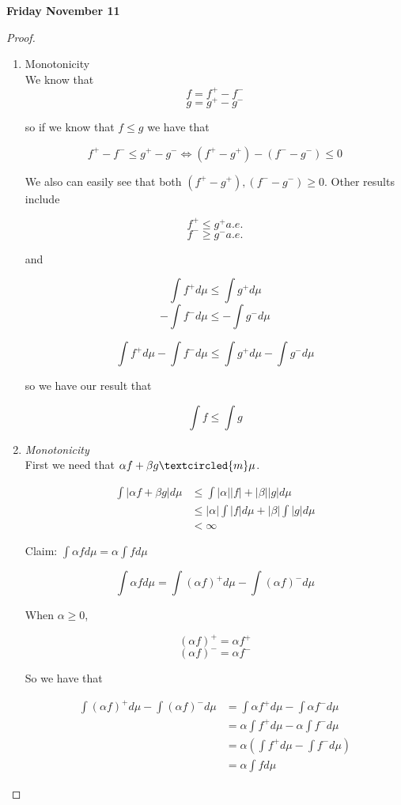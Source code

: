 \documentclass[11pt,fleqn]{book} %
\begin{document}
\textbf{Friday November 11}\\

\begin{proof}
	\begin{enumerate}
		\item Monotonicity\\
			We know that
				$$f = f^+ - f^- $$
				$$g = g^+ - g^- $$

			so if we know that $f \leq g$ we have that

					$$f^+  - f^- \leq g^+ - g^- \Leftrightarrow (f^+ - g^+ ) - (f^- - g^-) \leq 0$$

			We also can easily see that both $(f^+ - g^+ ), (f^- - g^-) \geq 0$. Other results include

					$$f^+ \leq g^+ a.e.$$
					$$f^- \geq g^- a.e.$$

			and

					$$\int f^+ d\mu \leq \int g^+ d\mu$$
					$$-\int f^- d\mu \leq -\int g^- d\mu$$

					$$\int f^+ d\mu  -\int f^- d\mu \leq \int g^+ d\mu -\int g^- d\mu$$

			so we have our result that

					$$\int f \leq \int g$$

		\item  \textit{Monotonicity}\\

		First we need that $\alpha f + \beta g \textcircled{m} \mu$. 

		\begin{align*}
			\int | \alpha f + \beta g| d\mu &\leq \int |\alpha| |f| + |\beta||g| d\mu\\
					&\leq |\alpha| \int |f| d\mu + |\beta| \int |g| d\mu\\
					&< \infty
		\end{align*}

		Claim: $\int \alpha f d\mu = \alpha \int f d\mu$

			
					$$\int \alpha f d\mu = \int (\alpha f)^+ d\mu - \int (\alpha f)^- d\mu$$
				

			When $\alpha \geq 0$, 

					$$(\alpha f)^+ = \alpha f^+ $$
					$$(\alpha f)^- = \alpha f^- $$

			So we have that 

					\begin{align*}
					 	\int (\alpha f)^+ d\mu - \int (\alpha f)^- d\mu &= \int \alpha f^+ d\mu - \int \alpha f^- d\mu\\
					 			&= \alpha \int f^+ d\mu - \alpha \int f^- d\mu\\
					 			&= \alpha( \int f^+ d\mu - \int f^- d\mu)\\
					 			&=\alpha \int f d\mu
					 \end{align*} 


\end{enumerate}
\end{proof}
\end{document}

